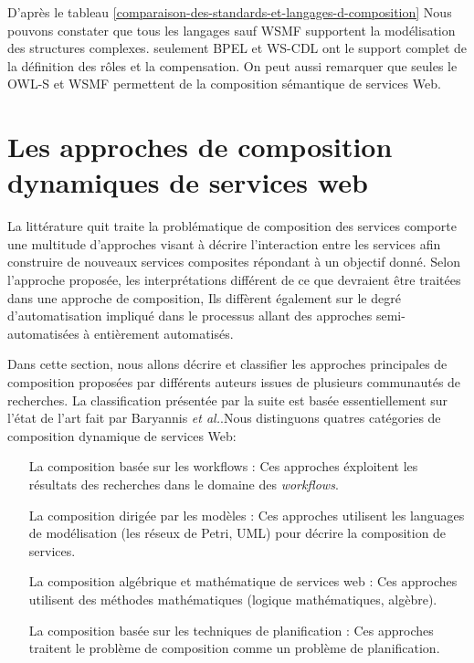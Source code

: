     D'après le tableau
    \ref{comparaison-des-standards-et-langages-d-composition} Nous
    pouvons constater que tous les langages sauf \textsc{WSMF}
    supportent la modélisation des structures complexes. seulement
    \textsc{BPEL} et \textsc{WS-CDL} ont le support complet de la
    définition des rôles et la compensation. On peut aussi remarquer
    que seules le \textsc{OWL-S} et \textsc{WSMF} permettent de la
    composition sémantique de services Web.

  \section{Les approches de composition dynamiques de services web}
  \label{sec:comp-dynam}

  La littérature quit traite la problématique de composition des
  services comporte une multitude d'approches visant à décrire
  l'interaction entre les services afin construire de nouveaux
  services composites répondant à un objectif donné. Selon l'approche
  proposée, les interprétations différent de ce que devraient être
  traitées dans une approche de composition, Ils diffèrent également
  sur le degré d'automatisation impliqué dans le processus allant des
  approches semi-automatisées à entièrement automatisés.

  Dans cette section, nous allons décrire et classifier les approches
  principales de composition proposées par différents auteurs issues
  de plusieurs communautés de recherches. La classification présentée
  par la suite est basée essentiellement sur l'état de l'art fait par
  Baryannis \emph{et al.}\cite{baryannis2010}.Nous distinguons quatres
  catégories de composition dynamique de services Web:


  \begin{itemize}
  \item[La composition  basée sur les workflows]: Ces approches
    éxploitent les résultats des recherches dans le domaine des
    \textit{workflows}.

  \item[La composition dirigée par les modèles]: Ces approches
    utilisent les languages de modélisation (les réseux de Petri,
    \textsc{UML}) pour décrire la composition de services.

  \item[La composition algébrique et mathématique de services web]:
    Ces approches utilisent des méthodes mathématiques (logique
    mathématiques, algèbre).

  \item[La composition basée sur les techniques de planification]: Ces
    approches traitent le problème de composition comme un problème de
    planification.
  \end{itemize}


